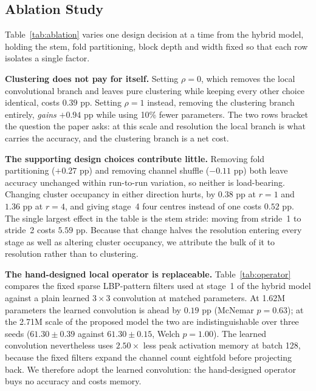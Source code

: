 \subsection{Ablation Study}
\label{sec:ablation}

Table~\ref{tab:ablation} varies one design decision at a time from the hybrid
model, holding the stem, fold partitioning, block depth and width fixed so
that each row isolates a single factor.

\textbf{Clustering does not pay for itself.} Setting $\rho = 0$, which removes
the local convolutional branch and leaves pure clustering while keeping every
other choice identical, costs $0.39$ pp. Setting $\rho = 1$ instead, removing
the clustering branch entirely, \emph{gains} $+0.94$ pp while using 10\% fewer
parameters. The two rows bracket the question the paper asks: at this scale and
resolution the local branch is what carries the accuracy, and the clustering
branch is a net cost.

\textbf{The supporting design choices contribute little.} Removing fold
partitioning ($+0.27$ pp) and removing channel shuffle ($-0.11$ pp) both leave
accuracy unchanged within run-to-run variation, so neither is load-bearing.
Changing cluster occupancy in either direction hurts, by $0.38$ pp at $r = 1$
and $1.36$ pp at $r = 4$, and giving stage~4 four centres instead of one costs
$0.52$ pp. The single largest effect in the table is the stem stride: moving
from stride~1 to stride~2 costs $5.59$ pp. Because that change halves the
resolution entering every stage as well as altering cluster occupancy, we
attribute the bulk of it to resolution rather than to clustering.

\textbf{The hand-designed local operator is replaceable.}
Table~\ref{tab:operator} compares the fixed sparse LBP-pattern filters used at
stage~1 of the hybrid model against a plain learned $3\times3$ convolution at
matched parameters. At 1.62M parameters the learned convolution is ahead by
$0.19$ pp (McNemar $p = 0.63$); at the 2.71M scale of the proposed model the
two are indistinguishable over three seeds ($61.30 \pm 0.39$ against
$61.30 \pm 0.15$, Welch $p = 1.00$). The learned convolution nevertheless
uses $2.50\times$ less peak activation memory at batch 128, because the fixed
filters expand the channel count eightfold before projecting back. We
therefore adopt the learned convolution: the hand-designed operator buys no
accuracy and costs memory.

